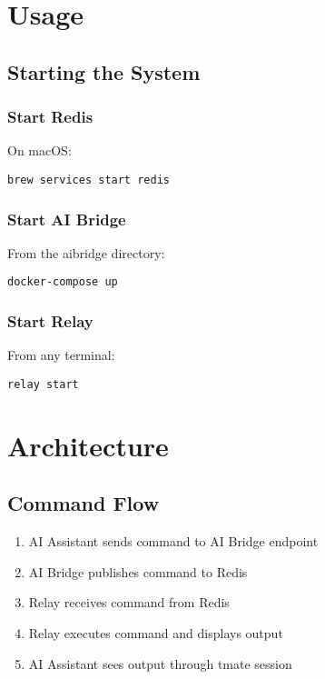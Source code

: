 \documentclass{article}
\begin{document}
\section{Usage}

\subsection{Starting the System}

\subsubsection{Start Redis}
On macOS:
\begin{verbatim}
brew services start redis
\end{verbatim}

\subsubsection{Start AI Bridge}
From the aibridge directory:
\begin{verbatim}
docker-compose up
\end{verbatim}

\subsubsection{Start Relay}
From any terminal:
\begin{verbatim}
relay start
\end{verbatim}

\section{Architecture}

\subsection{Command Flow}
\begin{enumerate}
    \item AI Assistant sends command to AI Bridge endpoint
    \item AI Bridge publishes command to Redis
    \item Relay receives command from Redis
    \item Relay executes command and displays output
    \item AI Assistant sees output through tmate session
\end{enumerate}
\end{document}
